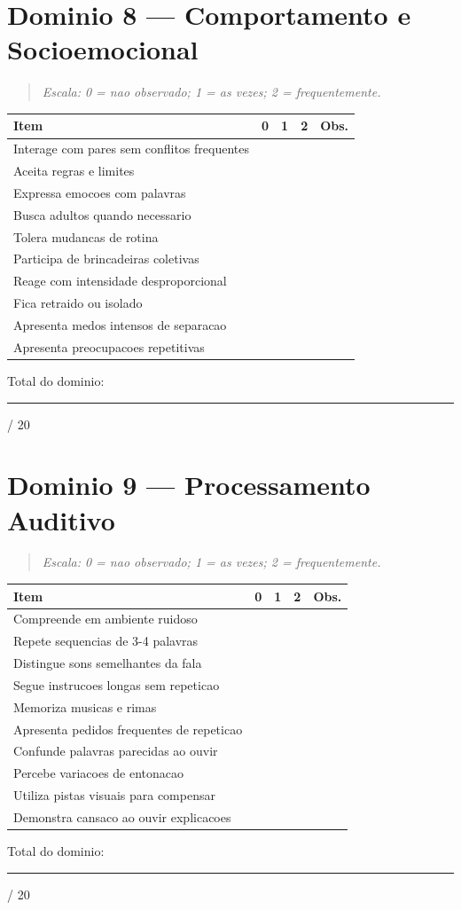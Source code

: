 \documentclass[a4paper,11pt]{book}
\begin{document}
\section{Dominio 8 --- Comportamento e Socioemocional}
\begin{quote}\itshape Escala: 0 = nao observado; 1 = as vezes; 2 = frequentemente.\end{quote}
\begin{tabular}{@{}p{10.5cm}ccc p{0.5cm}@{}}\toprule
Item & 0 & 1 & 2 & Obs. \\\midrule
Interage com pares sem conflitos frequentes & & & & \\
Aceita regras e limites & & & & \\
Expressa emocoes com palavras & & & & \\
Busca adultos quando necessario & & & & \\
Tolera mudancas de rotina & & & & \\
Participa de brincadeiras coletivas & & & & \\
Reage com intensidade desproporcional & & & & \\
Fica retraido ou isolado & & & & \\
Apresenta medos intensos de separacao & & & & \\
Apresenta preocupacoes repetitivas & & & & \\
\bottomrule\end{tabular}
\vspace{0.2cm}\noindent\small Total do dominio: \rule{1cm}{0.3pt} / 20\par\medskip


\section{Dominio 9 --- Processamento Auditivo}
\begin{quote}\itshape Escala: 0 = nao observado; 1 = as vezes; 2 = frequentemente.\end{quote}
\begin{tabular}{@{}p{10.5cm}ccc p{0.5cm}@{}}\toprule
Item & 0 & 1 & 2 & Obs. \\\midrule
Compreende em ambiente ruidoso & & & & \\
Repete sequencias de 3-4 palavras & & & & \\
Distingue sons semelhantes da fala & & & & \\
Segue instrucoes longas sem repeticao & & & & \\
Memoriza musicas e rimas & & & & \\
Apresenta pedidos frequentes de repeticao & & & & \\
Confunde palavras parecidas ao ouvir & & & & \\
Percebe variacoes de entonacao & & & & \\
Utiliza pistas visuais para compensar & & & & \\
Demonstra cansaco ao ouvir explicacoes & & & & \\
\bottomrule\end{tabular}
\vspace{0.2cm}\noindent\small Total do dominio: \rule{1cm}{0.3pt} / 20\par\medskip
\end{document}
